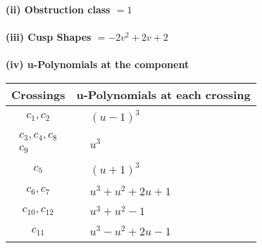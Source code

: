 \documentclass[1p]{elsarticle_modified}
\theoremstyle{definition}
\begin{document}
\flushleft \textbf{(ii) Obstruction class $= 1$}\\~\\
\flushleft \textbf{(iii) Cusp Shapes $= -2 v^2+2 v+2$}\\~\\
\newpage\renewcommand{\arraystretch}{1}
\flushleft \textbf{(iv) u-Polynomials at the component}\newline \\
\begin{tabular}{m{50pt}|m{274pt}}
Crossings & \hspace{64pt}u-Polynomials at each crossing \\
\hline $$\begin{aligned}c_{1},c_{2}\end{aligned}$$&$\begin{aligned}
&(u-1)^3
\end{aligned}$\\
\hline $$\begin{aligned}c_{3},c_{4},c_{8}\\c_{9}\end{aligned}$$&$\begin{aligned}
&u^3
\end{aligned}$\\
\hline $$\begin{aligned}c_{5}\end{aligned}$$&$\begin{aligned}
&(u+1)^3
\end{aligned}$\\
\hline $$\begin{aligned}c_{6},c_{7}\end{aligned}$$&$\begin{aligned}
&u^3+u^2+2 u+1
\end{aligned}$\\
\hline $$\begin{aligned}c_{10},c_{12}\end{aligned}$$&$\begin{aligned}
&u^3+u^2-1
\end{aligned}$\\
\hline $$\begin{aligned}c_{11}\end{aligned}$$&$\begin{aligned}
&u^3- u^2+2 u-1
\end{aligned}$\\
\hline
\end{tabular}\\~\\
\end{document}
